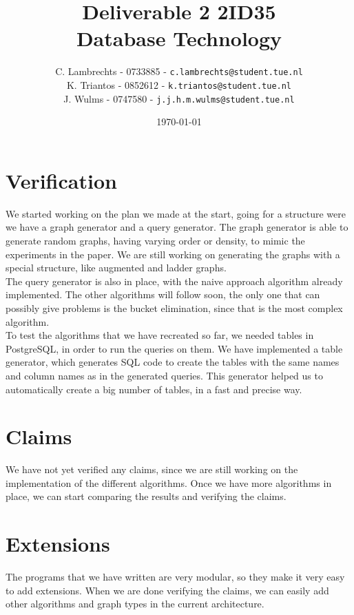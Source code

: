 \documentclass[a4paper,twoside,11pt]{article}
\title{\vspace{-\baselineskip}\sffamily\bfseries Deliverable 2 2ID35 \\ Database Technology }
\author{
C. Lambrechts - 0733885 - {\tt c.lambrechts@student.tue.nl} \\
K. Triantos - 0852612 - {\tt k.triantos@student.tue.nl}\\
J. Wulms - 0747580 - {\tt j.j.h.m.wulms@student.tue.nl}\\
}
\date{\today}
\numberwithin{equation}{section}
\begin{document}
\maketitle
\thispagestyle{empty}
\begin{abstract}

\end{abstract}

\section{Verification} \label{sec:Verification}
We started working on the plan we made at the start, going for a structure were we have a graph generator and a query generator. The graph generator is able to generate random graphs, having varying order or density, to mimic the experiments in the paper. We are still working on generating the graphs with a special structure, like augmented and ladder graphs. \\

The query generator is also in place, with the naive approach algorithm already implemented. The other algorithms will follow soon, the only one that can possibly give problems is the bucket elimination, since that is the most complex algorithm. \\

To test the algorithms that we have recreated so far, we needed tables in PostgreSQL, in order to run the queries on them. We have implemented a table generator, which generates SQL code to create the tables with the same names and column names as in the generated queries. This generator helped us to automatically create a big number of tables, in a fast and precise way. 

\section{Claims} \label{sec:Claims}
We have not yet verified any claims, since we are still working on the implementation of the different algorithms. Once we have more algorithms in place, we can start comparing the results and verifying the claims. 

\section{Extensions} \label{sec:Extensions}
The programs that we have written are very modular, so they make it very easy to add extensions. When we are done verifying the claims, we can easily add other algorithms and graph types in the current architecture.
\end{document}
